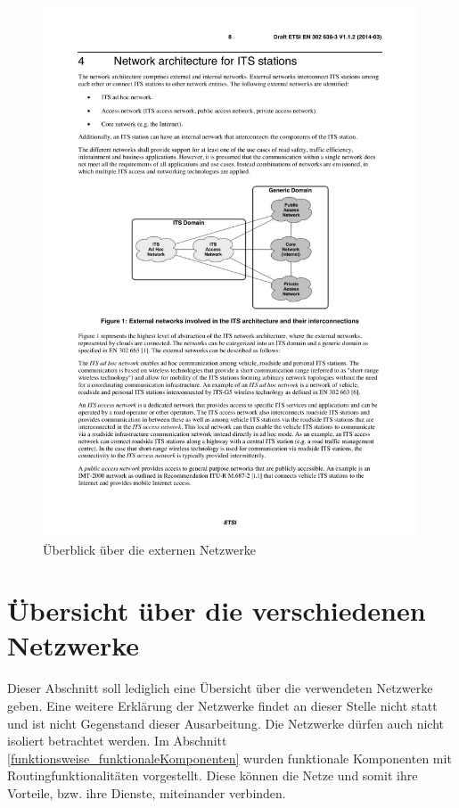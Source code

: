 \begin{figure}[h]
	\includegraphics[width=0.99\textwidth]{content/images/02_architektur/uebersichtExterneNetzwerke.pdf}
	\caption{Überblick über die externen Netzwerke \cite{etsi302636-3}}
	\label{fig:architektur_ueberblickNetzwerke}
\end{figure}

\section{Übersicht über die verschiedenen Netzwerke}
Dieser Abschnitt soll lediglich eine Übersicht über die verwendeten Netzwerke geben. Eine weitere Erklärung der Netzwerke findet an dieser Stelle nicht statt und ist nicht Gegenstand dieser Ausarbeitung. Die Netzwerke dürfen auch nicht isoliert betrachtet werden. Im Abschnitt \ref{funktionsweise_funktionaleKomponenten} wurden funktionale Komponenten mit Routingfunktionalitäten vorgestellt. Diese können die Netze und somit ihre Vorteile, bzw. ihre Dienste, miteinander verbinden.

